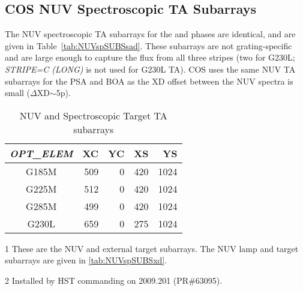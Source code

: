\subsection{COS NUV Spectroscopic TA Subarrays}\label{subsec:NUVspSUBS}
The NUV spectroscopic TA subarrays for the  and  phases are identical, and are given in Table~\ref{tab:NUVspSUBSsad}.
These subarrays are not grating-specific and are large enough to capture the flux from all three stripes (two for G230L; \textit{STRIPE=C (LONG)} is not used for G230L TA).
COS uses the same NUV TA subarrays for the PSA and BOA as the XD offset between the NUV spectra is small ($\Delta$XD$\sim$5p).
\begin{table}
\centering
	\begin{threeparttable}[tbc]
		\caption[NUV Spectroscopic  and  TA subarrays]{NUV  and  Spectroscopic Target TA subarrays}
		\begin{tabular*}{.6\linewidth}{@{\extracolsep{\fill}}|c|rrrr|}
			\\
			\hline
			\textit{OPT\_ELEM}& XC & YC & XS & YS \\
			\hline
			G185M&509&0&420&1024\\
			G225M&512&0&420&1024\\
			G285M&499&0&420&1024\\
			G230L&659&0&275&1024\\
			\hline
		\end{tabular*}
		\footnotesize
		\begin{tablenotes}[para]
			\item [1] These are the NUV  and  external target subarrays.
			 The NUV  lamp and target subarrays are given in \ref{tab:NUVspSUBSxd}.
			\item [2] Installed by HST commanding on 2009.201 (PR\#63095).
		   \end{tablenotes}
		\label{tab:NUVspSUBSsad2}
		\normalsize
	\end{threeparttable}
\end{table}
